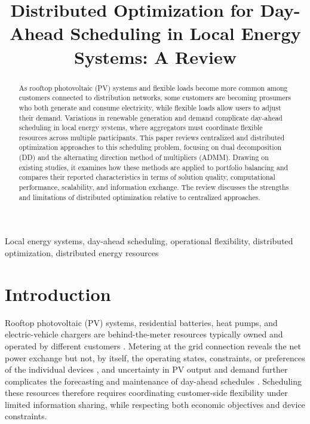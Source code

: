 \documentclass[conference]{IEEEtran}
\begin{document}
\title{Distributed Optimization for Day-Ahead Scheduling in Local Energy Systems: A Review}

\author{
}

\maketitle

\begin{abstract}
As rooftop photovoltaic (PV) systems and flexible loads become more common among customers connected to distribution networks, some customers are becoming prosumers who both generate and consume electricity, while flexible loads allow users to adjust their demand. Variations in renewable generation and demand complicate day-ahead scheduling in local energy systems, where aggregators must coordinate flexible resources across multiple participants. This paper reviews centralized and distributed optimization approaches to this scheduling problem, focusing on dual decomposition (DD) and the alternating direction method of multipliers (ADMM). Drawing on existing studies, it examines how these methods are applied to portfolio balancing and compares their reported characteristics in terms of solution quality, computational performance, scalability, and information exchange. The review discusses the strengths and limitations of distributed optimization relative to centralized approaches.
 

\end{abstract}

\begin{IEEEkeywords}
Local energy systems, day-ahead scheduling, operational flexibility, distributed optimization, distributed energy resources
\end{IEEEkeywords}

\section{Introduction}
Rooftop photovoltaic (PV) systems, residential batteries, heat pumps, and electric-vehicle chargers are behind-the-meter resources typically owned and operated by different customers \cite{Diekerhof2018,OlivellaRosell2020}. Metering at the grid connection reveals the net power exchange but not, by itself, the operating states, constraints, or preferences of the individual devices \cite{Diekerhof2018}, and uncertainty in PV output and demand further complicates the forecasting and maintenance of day-ahead schedules \cite{Diekerhof2018}. Scheduling these resources therefore requires coordinating customer-side flexibility under limited information sharing, while respecting both economic objectives and device constraints.
\end{document}
